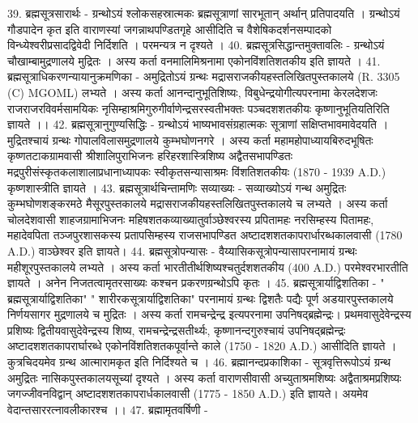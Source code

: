 39. ब्रह्मसूत्रसारार्थः -
ग्रन्थोऽयं श्लोकसहस्रात्मकः ब्रह्मसूत्राणां सारभूतान् अर्थान् प्रतिपादयति । ग्रन्थोऽयं गौडपादेन कृत इति वाराणस्यां जगन्नाथपण्डितगृहे आसीदिति च वैशेषिकदर्शनसम्पादको विन्ध्येश्वरीप्रसादद्विवेदी निर्दिशति । परमन्यत्र न दृश्यते । 
40. ब्रह्मसूत्रसिद्धान्तमुक्तावलिः -
ग्रन्थोऽयं चौखाम्बामुद्रणालये मुद्रितः । अस्य कर्ता वनमालिमिश्रनामा एकोनविंशतिशतकीय इति ज्ञायते ।
41. ब्रह्मसूत्राधिकरणन्यायानुक्रमणिका - 
अमुद्रितोऽयं ग्रन्थः मद्रासराजकीयहस्तलिखितपुस्तकालये (R. 3305 (C) MGOML) लभ्यते । अस्य कर्ता आनन्दानुभूतिशिष्यः, विबुधेन्द्रयोगीत्यपरनामा केरलदेशजः राजराजरविवर्मसामयिकः नृसिम्हाश्रमिगुरुगीर्वाणेन्द्रसरस्वतीभक्तः पञ्चदशशतकीयः कृष्णानुभूतियतिरिति ज्ञायते ।। 		
42. ब्रह्मसूत्रानुगुण्यसिद्धिः -
ग्रन्थोऽयं भाष्यभावसंग्रहात्मकः सूत्राणां सक्षिप्तभावमावेदयति । मुद्रितश्चायं ग्रन्थः गोपालविलासमुद्रणालये कुम्भघोणनगरे । अस्य कर्ता महामहोपाध्यायबिरुदभूषितः कृष्णतटाकग्रामवासी श्रीशालिपुराभिजनः हरिहरशास्त्रिशिष्य अद्वैतसभापण्डितः मद्रपुरीसंस्कृतकलाशालाप्रधानाध्यापकः स्वीकृतसन्यासाश्रमः विंशतिशतकीयः (1870 - 1939 A.D.) कृष्णशास्त्रीति ज्ञायते । 
43. ब्रह्मसूत्रार्थचिन्तामणिः सव्याख्यः -
सव्याख्योऽयं गन्थ अमुद्रितः कुम्भघोणशङ्करमठे मैसूरपुस्तकालये मद्रासराजकीयहस्तलिखितपुस्तकालये च लभ्यते । अस्य कर्ता चोलदेशवासी शाहजग्रामाभिजनः महिषशतकव्याख्यातुर्वाञ्छेश्वरस्य प्रपितामहः नरसिम्हस्य पितामहः, महादेवपिता तञ्जपुरशासकस्य प्रतापसिम्हस्य राजसभापण्डित अष्टादशशतकापरार्धारब्धकालवासी (1780 A.D.) वाञ्छेश्वर इति ज्ञायते। 
44. ब्रह्मसूत्रोपन्यासः -
वैय्यासिकसूत्रोपन्यासापरनामायं ग्रन्थः महीशूरपुस्तकालये लभ्यते । अस्य कर्ता भारतीतीर्थशिष्यश्चतुर्दशशतकीय (400 A.D.) परमेश्वरभारतीति ज्ञायते । अनेन निजतत्वामृतरसाख्यः कश्चन प्रकरणग्रन्थोऽपि कृतः ।
45. ब्रह्मसूत्रार्याद्विशतिका -
" ब्रह्मसूत्रार्याद्विशतिका" " शारीरकसूत्रार्याद्विशतिका" परनामायं ग्रन्थः द्विशतैः पद्यैः पूर्ण अडयारपुस्तकालये निर्णयसागर मुद्रणालये च मुद्रितः । अस्य कर्ता रामचन्द्रेन्द्र इत्यपरनामा उपनिषद्ब्रह्मेन्द्रः। प्रथमवासुदेवेन्द्रस्य प्रशिष्यः द्वितीयवासुदेवेन्द्रस्य शिष्य, रामचन्द्रेन्द्रसतीर्थ्यः, कृष्णानन्दगुरुश्चायं उपनिषद्ब्रह्मेन्द्रः अष्टादशशतकापरार्घारब्धे एकोनविंशतिशतकपूर्वान्ते काले (1750 - 1820 A.D.) आसीदिति ज्ञायते । कुत्रचिदयमेव ग्रन्थ आत्मारामकृत इति निर्दिश्यते च । 
46. ब्रह्मानन्दप्रकाशिका -
सूत्रवृत्तिरूपोऽयं ग्रन्थ अमुद्रितः नासिकपुस्तकालयसूच्यां दृश्यते । अस्य कर्ता वाराणसीवासी अच्युताश्रमशिष्यः अद्वैताश्रमप्रशिष्यः जगज्जीवनविद्वान् अष्टादशशतकापरार्धकालवासी (1775 - 1850 A.D.) इति ज्ञायते। अयमेव वेदान्तसाररत्नावलीकारश्च ।। 
47. ब्रह्मामृतवर्षिणी -
